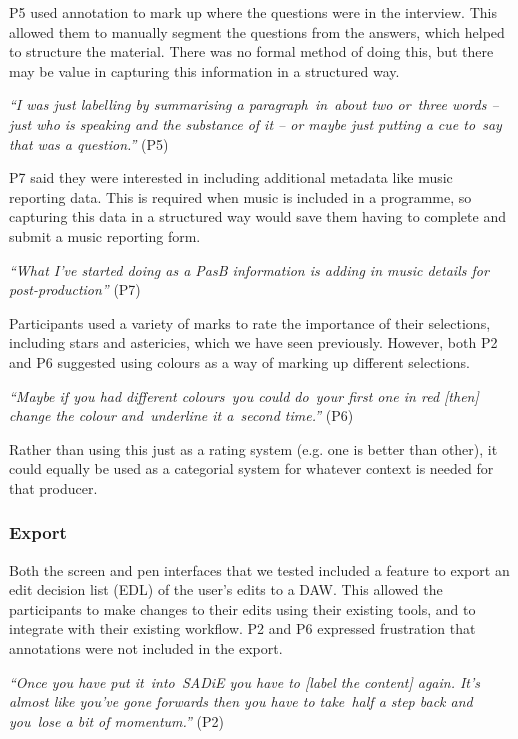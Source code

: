
P5 used annotation to mark up where the questions were in the interview. This allowed them to manually segment the
questions from the answers, which helped to structure the material. There was no formal method of doing this, but there
may be value in capturing this information in a structured way.

\textit{``I was just labelling by summarising a paragraph in about two or three words -- just who is speaking and the
substance of it -- or maybe just putting a cue to say that was a question.''} (P5) 

P7 said they were interested in including additional metadata like music reporting data. This is required when music is
included in a programme, so capturing this data in a structured way would save them having to complete and submit a
music reporting form.

\textit{``What I've started doing as a PasB information is adding in music details for post-production''} (P7)


Participants used a variety of marks to rate the importance of their selections, including stars and astericies, which
we have seen previously. However, both P2 and P6 suggested using colours as a way of marking up different selections.

\textit{``Maybe if you had different colours you could do your first one in red [then]
  change the colour and underline it a second time.''} (P6)

Rather than using this just as a rating system (e.g. one is better than other), it could equally be used as a
categorial system for whatever context is needed for that producer.

\subsubsection{Export}

Both the screen and pen interfaces that we tested included a feature to export an edit decision list (EDL) of the
user's edits to a DAW. This allowed the participants to make changes to their edits using their existing tools, and to
integrate with their existing workflow.  P2 and P6 expressed frustration that annotations were not included in the
export.

\textit{``Once you have put it into SADiE you have to [label the content] again. It's almost like you've gone forwards
then you have to take half a step back and you lose a bit of momentum.''} (P2)


